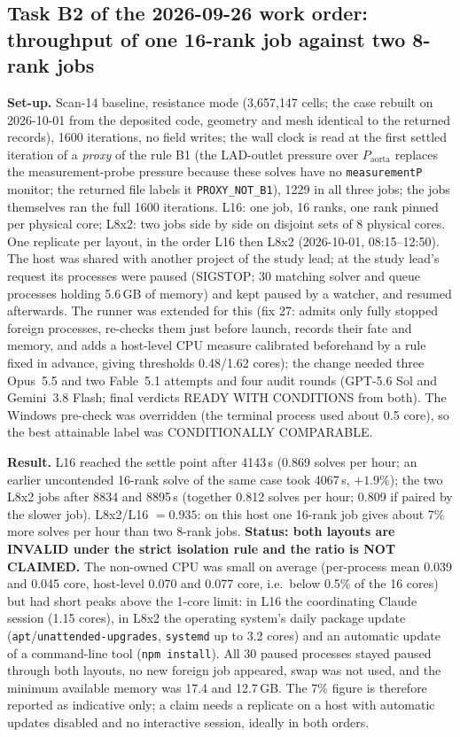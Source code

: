 \documentclass[11pt]{article}
\begin{document}
\subsection{Task B2 of the 2026-09-26 work order: throughput of one 16-rank job against two 8-rank jobs}
\label{sec:b2}
\textbf{Set-up.} Scan-14 baseline, resistance mode (3{,}657{,}147 cells; the case rebuilt on 2026-10-01 from the deposited code, geometry and mesh identical to the returned records), 1600 iterations, no field writes; the wall clock is read at the first settled iteration of a \emph{proxy} of the rule B1 (the LAD-outlet pressure over $P_\text{aorta}$ replaces the measurement-probe pressure because these solves have no \texttt{measurementP} monitor; the returned file labels it \texttt{PROXY\_NOT\_B1}), 1229 in all three jobs; the jobs themselves ran the full 1600 iterations. L16: one job, 16 ranks, one rank pinned per physical core; L8x2: two jobs side by side on disjoint sets of 8 physical cores. One replicate per layout, in the order L16 then L8x2 (2026-10-01, 08:15--12:50). The host was shared with another project of the study lead; at the study lead's request its processes were paused (SIGSTOP; 30 matching solver and queue processes holding 5.6\,GB of memory) and kept paused by a watcher, and resumed afterwards. The runner was extended for this (fix 27: admits only fully stopped foreign processes, re-checks them just before launch, records their fate and memory, and adds a host-level CPU measure calibrated beforehand by a rule fixed in advance, giving thresholds 0.48/1.62 cores); the change needed three Opus~5.5 and two Fable~5.1 attempts and four audit rounds (GPT-5.6 Sol and Gemini~3.8 Flash; final verdicts READY WITH CONDITIONS from both). The Windows pre-check was overridden (the terminal process used about 0.5 core), so the best attainable label was CONDITIONALLY COMPARABLE.

\textbf{Result.} L16 reached the settle point after 4143\,s (0.869 solves per hour; an earlier uncontended 16-rank solve of the same case took 4067\,s, $+1.9\%$); the two L8x2 jobs after 8834 and 8895\,s (together 0.812 solves per hour; 0.809 if paired by the slower job). L8x2/L16 $=0.935$: on this host one 16-rank job gives about 7\% more solves per hour than two 8-rank jobs. \textbf{Status: both layouts are INVALID under the strict isolation rule and the ratio is NOT CLAIMED.} The non-owned CPU was small on average (per-process mean 0.039 and 0.045 core, host-level 0.070 and 0.077 core, i.e.\ below 0.5\% of the 16 cores) but had short peaks above the 1-core limit: in L16 the coordinating Claude session (1.15 cores), in L8x2 the operating system's daily package update (\texttt{apt}/\texttt{unattended-upgrades}, \texttt{systemd} up to 3.2 cores) and an automatic update of a command-line tool (\texttt{npm install}). All 30 paused processes stayed paused through both layouts, no new foreign job appeared, swap was not used, and the minimum available memory was 17.4 and 12.7\,GB. The 7\% figure is therefore reported as indicative only; a claim needs a replicate on a host with automatic updates disabled and no interactive session, ideally in both orders.
\end{document}
